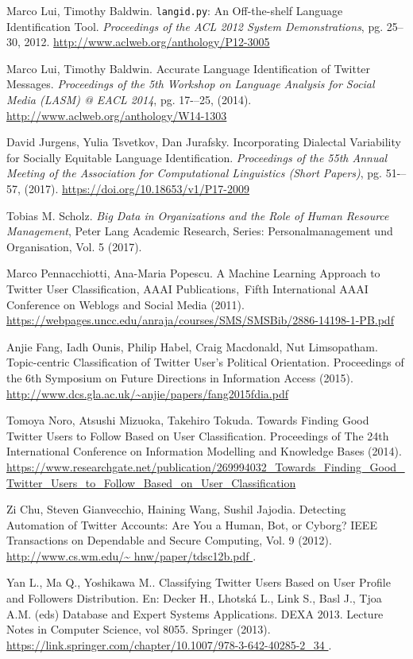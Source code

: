 \begin{thebibliography}{3}
 Marco Lui, Timothy Baldwin. {\tt langid.py}: An Off-the-shelf Language Identification Tool.
{\em Proceedings of the ACL 2012 System Demonstrations}, pg. 25--30, 2012.
\url{http://www.aclweb.org/anthology/P12-3005}

 Marco Lui, Timothy Baldwin. Accurate Language Identification of Twitter Messages. 
{\em Proceedings of the 5th Workshop on Language Analysis for Social Media (LASM) @ EACL 2014}, pg. 17-–25,
(2014). \url{http://www.aclweb.org/anthology/W14-1303}

 David Jurgens, Yulia Tsvetkov, Dan Jurafsky. Incorporating Dialectal Variability
for Socially Equitable Language Identification. 
{\em Proceedings of the 55th Annual Meeting of the Association for Computational Linguistics (Short Papers)}, 
pg. 51-–57, (2017). \url{https://doi.org/10.18653/v1/P17-2009}

 Tobias M. Scholz. {\em Big Data in Organizations and the Role of
Human Resource Management}, Peter Lang Academic Research, Series: Personalmanagement und
Organisation, Vol. 5 (2017).

Marco Pennacchiotti, Ana-Maria Popescu. A Machine Learning Approach to Twitter User Classification, AAAI Publications, Fifth International AAAI Conference on Weblogs and Social Media (2011).
\url{https://webpages.uncc.edu/anraja/courses/SMS/SMSBib/2886-14198-1-PB.pdf }

 Anjie Fang, Iadh Ounis, Philip Habel, Craig Macdonald, Nut Limsopatham.
Topic-centric Classification of Twitter User’s Political Orientation. Proceedings of the 
6th Symposium on Future Directions in Information Access (2015).
\url{http://www.dcs.gla.ac.uk/~anjie/papers/fang2015fdia.pdf }

 Tomoya Noro, Atsushi Mizuoka, Takehiro Tokuda. 
Towards Finding Good Twitter Users to Follow Based on User Classification.
Proceedings of The 24th International Conference on Information Modelling and Knowledge 
Bases (2014). \url{https://www.researchgate.net/publication/269994032_Towards_Finding_Good_Twitter_Users_to_Follow_Based_on_User_Classification }

 Zi Chu, Steven Gianvecchio, Haining Wang, Sushil Jajodia. 
Detecting Automation of Twitter Accounts: Are You a Human, Bot, or Cyborg?
IEEE Transactions on Dependable and Secure Computing, Vol. 9 (2012).
\url{http://www.cs.wm.edu/\~ hnw/paper/tdsc12b.pdf }.

 Yan L., Ma Q., Yoshikawa M.. Classifying Twitter Users Based on User Profile and Followers Distribution. En: Decker H., Lhotská L., Link S., Basl J., Tjoa A.M. (eds) Database and Expert Systems Applications. DEXA 2013. Lecture Notes in Computer Science, vol 8055. Springer (2013).
\url{https://link.springer.com/chapter/10.1007/978-3-642-40285-2_34 }.


\end{thebibliography}